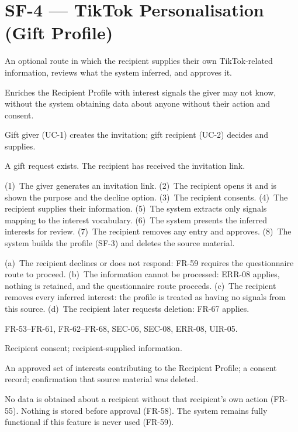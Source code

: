 \documentclass[11pt,a4paper]{report}
\begin{document}
\section{SF-4 --- TikTok Personalisation (Gift Profile)}
\begin{description}[style=nextline,leftmargin=0pt]
\item[Description] An optional route in which the recipient supplies their own TikTok-related information, reviews what the system inferred, and approves it.
\item[Purpose] Enriches the Recipient Profile with interest signals the giver may not know, without the system obtaining data about anyone without their action and consent.
\item[Actors] Gift giver (UC-1) creates the invitation; gift recipient (UC-2) decides and supplies.
\item[Preconditions] A gift request exists. The recipient has received the invitation link.
\item[Main flow] (1)~The giver generates an invitation link. (2)~The recipient opens it and is shown the purpose and the decline option. (3)~The recipient consents. (4)~The recipient supplies their information. (5)~The system extracts only signals mapping to the interest vocabulary. (6)~The system presents the inferred interests for review. (7)~The recipient removes any entry and approves. (8)~The system builds the profile (SF-3) and deletes the source material.
\item[Alternative and exception flows] (a)~The recipient declines or does not respond: FR-59 requires the questionnaire route to proceed. (b)~The information cannot be processed: ERR-08 applies, nothing is retained, and the questionnaire route proceeds. (c)~The recipient removes every inferred interest: the profile is treated as having no signals from this source. (d)~The recipient later requests deletion: FR-67 applies.
\item[Requirements] FR-53--FR-61, FR-62--FR-68, SEC-06, SEC-08, ERR-08, UIR-05.
\item[Inputs] Recipient consent; recipient-supplied information.
\item[Outputs] An approved set of interests contributing to the Recipient Profile; a consent record; confirmation that source material was deleted.
\item[Constraints] No data is obtained about a recipient without that recipient's own action (FR-55). Nothing is stored before approval (FR-58). The system remains fully functional if this feature is never used (FR-59).
\end{description}
\end{document}
